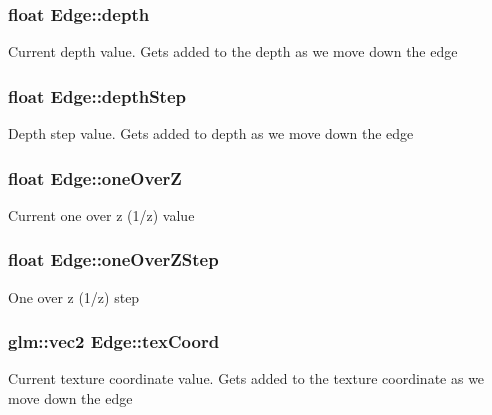\subsubsection[{depth}]{\setlength{\rightskip}{0pt plus 5cm}float Edge\+::depth}\label{class_edge_a997c97e02df725e1397a5e2fe4c573f3}
Current depth value. Gets added to the depth as we move down the edge \hypertarget{class_edge_ae85a7f75238e8212db2f1fc90729afcd}{}
\subsubsection[{depth\+Step}]{\setlength{\rightskip}{0pt plus 5cm}float Edge\+::depth\+Step}\label{class_edge_ae85a7f75238e8212db2f1fc90729afcd}
Depth step value. Gets added to depth as we move down the edge \hypertarget{class_edge_a183c69d2816a58570695cde3c3e73a8d}{}
\subsubsection[{one\+Over\+Z}]{\setlength{\rightskip}{0pt plus 5cm}float Edge\+::one\+Over\+Z}\label{class_edge_a183c69d2816a58570695cde3c3e73a8d}
Current one over z (1/z) value \hypertarget{class_edge_adee1d668c241bfc0dbad1637b07f2893}{}
\subsubsection[{one\+Over\+Z\+Step}]{\setlength{\rightskip}{0pt plus 5cm}float Edge\+::one\+Over\+Z\+Step}\label{class_edge_adee1d668c241bfc0dbad1637b07f2893}
One over z (1/z) step \hypertarget{class_edge_ac60ac724a2206426daeefa8781f1bef8}{}
\subsubsection[{tex\+Coord}]{\setlength{\rightskip}{0pt plus 5cm}glm\+::vec2 Edge\+::tex\+Coord}\label{class_edge_ac60ac724a2206426daeefa8781f1bef8}
Current texture coordinate value. Gets added to the texture coordinate as we move down the edge \hypertarget{class_edge_ab18d6715948ccf609e0b40f48349b533}{}

